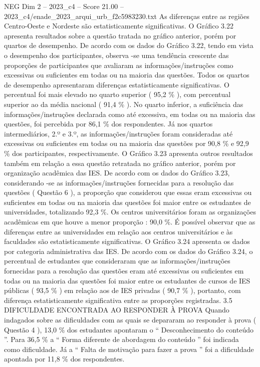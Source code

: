 \begin{textsample}{NEG Dim 2 – 2023\_c4 – Score 21.00 – 2023\_c4/enade\_2023\_arqui\_urb\_f2c5983230.txt}
As diferenças entre as regiões Centro-Oeste e Nordeste são estatisticamente significativas.
O Gráfico 3.22 apresenta resultados sobre a questão tratada no gráfico anterior, porém por quartos de desempenho.
De acordo com os dados do Gráfico 3.22, tendo em vista o desempenho dos participantes, observa -se uma tendência crescente das proporções de participantes que avaliaram as informações/instruções como excessivas ou suficientes em todas ou na maioria das questões.
Todos os quartos de desempenho apresentaram diferenças estatisticamente significativas.
O percentual foi mais elevado no quarto superior ( 95,2 \% ), com percentual superior ao da média nacional ( 91,4 \% ).
No quarto inferior, a suficiência das informações/instruções declarada como até excessiva, em todas ou na maioria das questões, foi percebida por 86,1 \% dos respondentes.
Já nos quartos intermediários, 2.º e 3.º, as informações/instruções foram consideradas até excessivas ou suficientes em todas ou na maioria das questões por 90,8 \% e 92,9 \% dos participantes, respectivamente.
O Gráfico 3.23 apresenta outros resultados também em relação a essa questão retratada no gráfico anterior, porém por organização acadêmica das IES.
De acordo com os dados do Gráfico 3.23, considerando -se as informações/instruções fornecidas para a resolução das questões ( Questão 6 ), a proporção que considerou que essas eram excessivas ou suficientes em todas ou na maioria das questões foi maior entre os estudantes de universidades, totalizando 92,3 \%.
Os centros universitários foram as organizações acadêmicas em que houve a menor proporção : 90,0 \%.
É possível observar que as diferenças entre as universidades em relação aos centros universitários e às faculdades são estatisticamente significativas.
O Gráfico 3.24 apresenta os dados por categoria administrativa das IES.
De acordo com os dados do Gráfico 3.24, o percentual de estudantes que consideraram que as informações/instruções fornecidas para a resolução das questões eram até excessivas ou suficientes em todas ou na maioria das questões foi maior entre os estudantes de cursos de IES públicas ( 93,5 \% ) em relação aos de IES privadas ( 90,7 \% ), portanto, com diferença estatisticamente significativa entre as proporções registradas. 3.5 DIFICULDADE ENCONTRADA AO RESPONDER À PROVA Quando indagados sobre as dificuldades com as quais se depararam ao responder à prova ( Questão 4 ), 13,0 \% dos estudantes apontaram o “ Desconhecimento do conteúdo ”.
Para 36,5 \% a “ Forma diferente de abordagem do conteúdo ” foi indicada como dificuldade.
Já a “ Falta de motivação para fazer a prova ” foi a dificuldade apontada por 11,8 \% dos respondentes.

\end{textsample}
